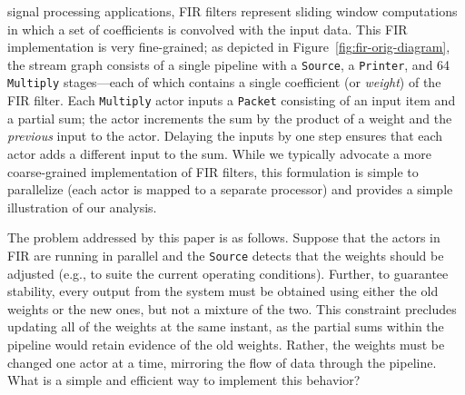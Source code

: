 \documentclass{sig-alternate}
\begin{document}
\clearpage
\noindent 
%
signal processing applications, FIR filters represent sliding window
computations in which a set of coefficients is convolved with the
input data.  This FIR implementation is very fine-grained; as depicted
in Figure~\ref{fig:fir-orig-diagram}, the stream graph consists of a
single pipeline with a {\tt Source}, a {\tt Printer}, and 64 {\tt
Multiply} stages---each of which contains a single coefficient (or
{\it weight}) of the FIR filter.  Each {\tt Multiply} actor inputs a
{\tt Packet} consisting of an input item and a partial sum; the actor
increments the sum by the product of a weight and the {\it previous}
input to the actor.  Delaying the inputs by one step ensures that each
actor adds a different input to the sum.  While we typically advocate
a more coarse-grained implementation of FIR filters, this formulation
is simple to parallelize (each actor is mapped to a separate
processor) and provides a simple illustration of our analysis.

The problem addressed by this paper is as follows.  Suppose that the
actors in FIR are running in parallel and the {\tt Source} detects
that the weights should be adjusted (e.g., to suite the current
operating conditions).  Further, to guarantee stability, every output
from the system must be obtained using either the old weights or the
new ones, but not a mixture of the two.  This constraint precludes
updating all of the weights at the same instant, as the partial sums
within the pipeline would retain evidence of the old weights.  Rather,
the weights must be changed one actor at a time, mirroring the flow of
data through the pipeline.  What is a simple and efficient way to
implement this behavior?
\end{document}

